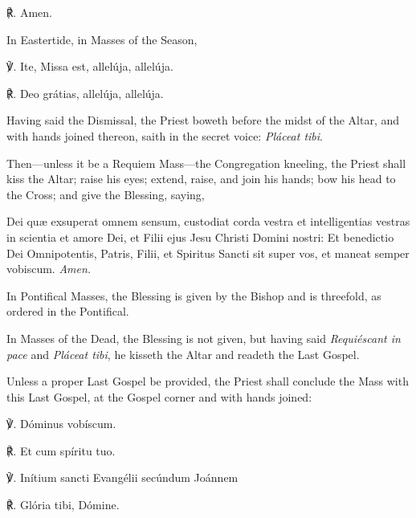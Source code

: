     ℟. Amen.
\begin{rubric}
    In Eastertide, in Masses of the Season,
\end{rubric}
    ℣. Ite, Missa est, allelúja, allelúja.
    
    ℟. Deo grátias, allelúja, allelúja.
\begin{rubric}
    Having said the Dismissal, the Priest boweth before the midst of the Altar, and with hands joined thereon, saith in the secret voice: \emph{Pláceat tibi}.
\end{rubric}
\begin{rubric}
    Then---unless it be a Requiem Mass---the Congregation kneeling, the Priest shall kiss the Altar; raise his eyes; extend, raise, and join his hands; bow his head to the Cross; and give the Blessing, saying,
\end{rubric}
 Dei quæ exsuperat omnem sensum, custodiat corda vestra et intelligentias vestras in scientia et amore Dei, et Filii ejus Jesu Christi Domini nostri: Et benedictio Dei Omnipotentis, Patris, {} Filii, et Spiritus Sancti sit super vos, et maneat semper vobiscum. \textit{Amen.}
\begin{rubric}
    In Pontifical Masses, the Blessing is given by the Bishop and is threefold, as ordered in the Pontifical.
\end{rubric}
\begin{rubric}
    In Masses of the Dead, the Blessing is not given, but having said \emph{Requiéscant in pace} and \emph{Pláceat tibi}, he kisseth the Altar and readeth the Last Gospel.
\end{rubric}
\begin{rubric}
    Unless a proper Last Gospel be provided, the Priest shall conclude the Mass with this Last Gospel, at the Gospel corner and with hands joined:
\end{rubric}

℣. Dóminus vobíscum.

℟. Et cum spíritu tuo.

℣. Inítium {} sancti Evangélii secúndum Joánnem

℟. Glória tibi, Dómine.

